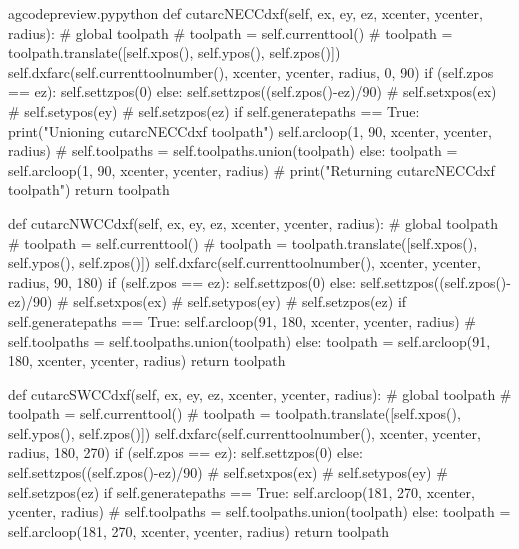 \documentclass{ltxdoc}
\begin{document}
\lstset{firstnumber=\thegcpy}
\begin{writecode}{a}{gcodepreview.py}{python}
    def cutarcNECCdxf(self, ex, ey, ez, xcenter, ycenter, radius):
#        global toolpath
#        toolpath = self.currenttool()
#        toolpath = toolpath.translate([self.xpos(), self.ypos(), self.zpos()])
        self.dxfarc(self.currenttoolnumber(), xcenter, ycenter, radius, 0, 90)
        if (self.zpos == ez):
            self.settzpos(0)
        else:         
            self.settzpos((self.zpos()-ez)/90)
#        self.setxpos(ex)
#        self.setypos(ey)
#        self.setzpos(ez)
        if self.generatepaths == True:
            print("Unioning cutarcNECCdxf toolpath")
            self.arcloop(1, 90, xcenter, ycenter, radius)
#            self.toolpaths = self.toolpaths.union(toolpath)
        else:
            toolpath = self.arcloop(1, 90, xcenter, ycenter, radius)
#            print("Returning cutarcNECCdxf toolpath")
            return toolpath

    def cutarcNWCCdxf(self, ex, ey, ez, xcenter, ycenter, radius):
#        global toolpath
#        toolpath = self.currenttool()
#        toolpath = toolpath.translate([self.xpos(), self.ypos(), self.zpos()])
        self.dxfarc(self.currenttoolnumber(), xcenter, ycenter, radius, 90, 180)
        if (self.zpos == ez):
            self.settzpos(0)
        else:         
            self.settzpos((self.zpos()-ez)/90)
#        self.setxpos(ex)
#        self.setypos(ey)
#        self.setzpos(ez)
        if self.generatepaths == True:
            self.arcloop(91, 180, xcenter, ycenter, radius)
#            self.toolpaths = self.toolpaths.union(toolpath)
        else:
            toolpath = self.arcloop(91, 180, xcenter, ycenter, radius)
            return toolpath

    def cutarcSWCCdxf(self, ex, ey, ez, xcenter, ycenter, radius):
#        global toolpath
#        toolpath = self.currenttool()
#        toolpath = toolpath.translate([self.xpos(), self.ypos(), self.zpos()])
        self.dxfarc(self.currenttoolnumber(), xcenter, ycenter, radius, 180, 270)
        if (self.zpos == ez):
            self.settzpos(0)
        else:         
            self.settzpos((self.zpos()-ez)/90)
#        self.setxpos(ex)
#        self.setypos(ey)
#        self.setzpos(ez)
        if self.generatepaths == True:
            self.arcloop(181, 270, xcenter, ycenter, radius)
#            self.toolpaths = self.toolpaths.union(toolpath)
        else:
            toolpath = self.arcloop(181, 270, xcenter, ycenter, radius)
            return toolpath


\end{writecode}
\end{document}
